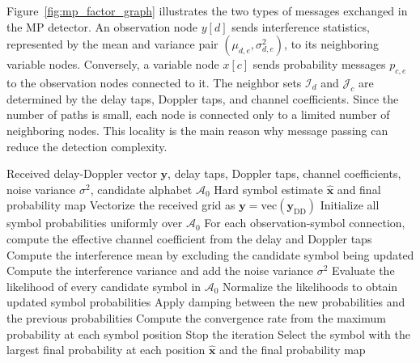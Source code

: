 Figure~\ref{fig:mp_factor_graph} illustrates the two types of messages exchanged in the MP detector. An observation node \(y[d]\) sends interference statistics, represented by the mean and variance pair \((\mu_{d,e},\sigma^2_{d,e})\), to its neighboring variable nodes. Conversely, a variable node \(x[c]\) sends probability messages \(p_{c,e}\) to the observation nodes connected to it. The neighbor sets \(\mathcal{I}_d\) and \(\mathcal{J}_c\) are determined by the delay taps, Doppler taps, and channel coefficients. Since the number of paths is small, each node is connected only to a limited number of neighboring nodes. This locality is the main reason why message passing can reduce the detection complexity.

\begin{algorithm}[H]
    \caption{Message passing detector for OTFS symbol detection}
    \label{alg:mp_detector}
    \begin{algorithmic}[1]
        \REQUIRE Received delay-Doppler vector \(\mathbf{y}\), delay taps, Doppler taps, channel coefficients, noise variance \(\sigma^2\), candidate alphabet \(\mathcal{A}_{0}\)
        \ENSURE Hard symbol estimate \(\widehat{\mathbf{x}}\) and final probability map
        \STATE Vectorize the received grid as \(\mathbf{y}=\mathrm{vec}(\mathbf{y}_{\mathrm{DD}})\)
        \STATE Initialize all symbol probabilities uniformly over \(\mathcal{A}_{0}\)
            \STATE For each observation-symbol connection, compute the effective channel coefficient from the delay and Doppler taps
            \STATE Compute the interference mean by excluding the candidate symbol being updated
            \STATE Compute the interference variance and add the noise variance \(\sigma^2\)
            \STATE Evaluate the likelihood of every candidate symbol in \(\mathcal{A}_{0}\)
            \STATE Normalize the likelihoods to obtain updated symbol probabilities
            \STATE Apply damping between the new probabilities and the previous probabilities
            \STATE Compute the convergence rate from the maximum probability at each symbol position
                \STATE Stop the iteration
            \ENDIF
        \ENDFOR
        \STATE Select the symbol with the largest final probability at each position
        \RETURN \(\widehat{\mathbf{x}}\) and the final probability map
    \end{algorithmic}
\end{algorithm}

